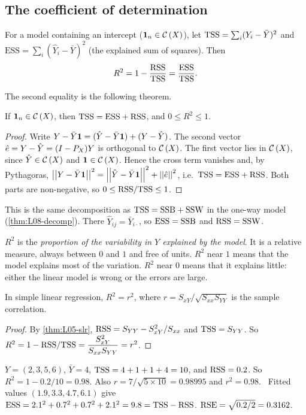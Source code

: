 \subsection{The coefficient of determination}
\begin{definition}[$R^2$]\label{def:L17-r2}
For a model containing an intercept ($\mathbf 1_n\in\mathcal{C}\left(X\right)$), let $\mathrm{TSS}=\sum_i(Y_i-\bar Y)^2$ and
$\mathrm{ESS}=\sum_i(\hat Y_i-\bar Y)^2$ (the explained sum of squares). Then
\[
R^2=1-\frac{\mathrm{RSS}}{\mathrm{TSS}}=\frac{\mathrm{ESS}}{\mathrm{TSS}}.
\]
\end{definition}
The second equality is the following theorem.

\begin{theorem}\label{thm:L17-decomp}
If $\mathbf 1_n\in\mathcal{C}\left(X\right)$, then $\mathrm{TSS}=\mathrm{ESS}+\mathrm{RSS}$, and $0\le R^2\le 1$.
\end{theorem}
\begin{proof}
Write $Y-\bar Y\mathbf 1=(\hat Y-\bar Y\mathbf 1)+(Y-\hat Y)$. The second vector $\hat e=Y-\hat Y=(I-P_X)Y$ is orthogonal to
$\mathcal{C}\left(X\right)$. The first vector lies in $\mathcal{C}\left(X\right)$, since $\hat Y\in\mathcal{C}\left(X\right)$ and $\mathbf 1\in\mathcal{C}\left(X\right)$. Hence the cross term
vanishes and, by Pythagoras,
$\left|\left|Y-\bar Y\mathbf 1\right|\right|^2=\left|\left|\hat Y-\bar Y\mathbf 1\right|\right|^2+\left|\left|\hat e\right|\right|^2$, i.e.\ $\mathrm{TSS}=\mathrm{ESS}+\mathrm{RSS}$. Both parts are
non-negative, so $0\le\mathrm{RSS}/\mathrm{TSS}\le1$.
\end{proof}
This is the same decomposition as $\mathrm{TSS}=\mathrm{SSB}+\mathrm{SSW}$ in the one-way model (\cref{thm:L08-decomp}). There
$\hat Y_{ij}=\bar Y_{i\cdot}$, so $\mathrm{ESS}=\mathrm{SSB}$ and $\mathrm{RSS}=\mathrm{SSW}$.

$R^2$ is the \emph{proportion of the variability in $Y$ explained by the model}. It is a relative measure, always
between $0$ and $1$ and free of units. $R^2$ near $1$ means that the model explains most of the variation. $R^2$
near $0$ means that it explains little: either the linear model is wrong or the errors are large.

\begin{theorem}\label{thm:L17-r2r}
In simple linear regression, $R^2=r^2$, where $r=S_{xY}/\sqrt{S_{xx}S_{YY}}$ is the sample correlation.
\end{theorem}
\begin{proof}
By \cref{thm:L05-slr}, $\mathrm{RSS}=S_{YY}-S_{xY}^2/S_{xx}$ and $\mathrm{TSS}=S_{YY}$. So
$R^2=1-\mathrm{RSS}/\mathrm{TSS}=\dfrac{S_{xY}^2}{S_{xx}S_{YY}}=r^2$.
\end{proof}

\begin{example}\label{ex:L17-hand}
$Y=(2,3,5,6)$, $\bar Y=4$, $\mathrm{TSS}=4+1+1+4=10$, and $\mathrm{RSS}=0.2$. So
$R^2=1-0.2/10=0.98$. Also $r=7/\sqrt{5\times10}=0.98995$ and $r^2=0.98$. \checkmark\ Fitted values
$(1.9,3.3,4.7,6.1)$ give $\mathrm{ESS}=2.1^2+0.7^2+0.7^2+2.1^2=9.8=\mathrm{TSS}-\mathrm{RSS}$. $\mathrm{RSE}=\sqrt{0.2/2}=0.3162$.
\end{example}


